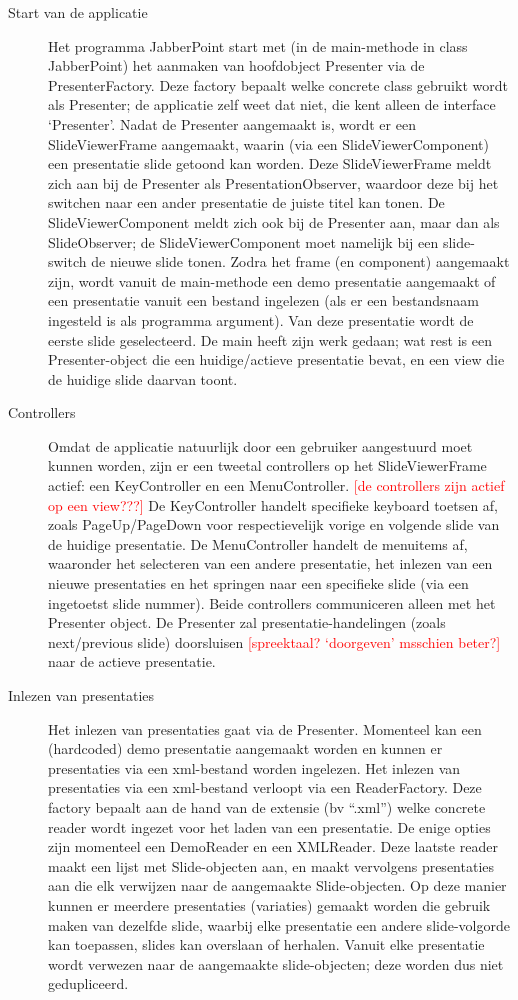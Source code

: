 \documentclass[a4paper]{article}
\newcommand{\todo}[1]{\textcolor{red}{[#1]}}
\begin{document}
\begin{description}
\item[Start van de applicatie] Het programma JabberPoint start met (in de main-methode in class JabberPoint) het aanmaken van hoofdobject Presenter via de PresenterFactory. Deze factory bepaalt welke concrete class gebruikt wordt als Presenter; de applicatie zelf weet dat niet, die kent alleen de interface ‘Presenter’.
Nadat de Presenter aangemaakt is, wordt er een SlideViewerFrame aangemaakt, waarin (via een SlideViewerComponent) een presentatie slide getoond kan worden. Deze SlideViewerFrame meldt zich aan bij de Presenter als PresentationObserver, waardoor deze bij het switchen naar een ander presentatie de juiste titel kan tonen. De SlideViewerComponent meldt zich ook bij de Presenter aan, maar dan als SlideObserver; de SlideViewerComponent moet namelijk bij een slide-switch de nieuwe slide tonen.
Zodra het frame (en component) aangemaakt zijn, wordt vanuit de main-methode een demo presentatie aangemaakt of een presentatie vanuit een bestand ingelezen (als er een bestandsnaam ingesteld is als programma argument). Van deze presentatie wordt de eerste slide geselecteerd.
De main heeft zijn werk gedaan; wat rest is een Presenter-object die een huidige/actieve presentatie bevat, en een view die de huidige slide daarvan toont.
\item[Controllers]
Omdat de applicatie natuurlijk door een gebruiker aangestuurd moet kunnen worden, zijn er een tweetal controllers op het SlideViewerFrame actief: een KeyController en een MenuController. \todo{de controllers zijn actief op een view???}  De KeyController handelt specifieke keyboard toetsen af, zoals PageUp/PageDown voor respectievelijk vorige en volgende slide van de huidige presentatie. De MenuController handelt de menuitems af, waaronder het selecteren van een andere presentatie, het inlezen van een nieuwe presentaties en het springen naar een specifieke slide (via een ingetoetst slide nummer). Beide controllers communiceren alleen met het Presenter object. De Presenter zal presentatie-handelingen (zoals next/previous slide) doorsluisen \todo{spreektaal? `doorgeven' msschien beter?} naar de actieve presentatie.
\item[Inlezen van presentaties]
Het inlezen van presentaties gaat via de Presenter. Momenteel kan een (hardcoded) demo presentatie aangemaakt worden en kunnen er presentaties via een xml-bestand worden ingelezen. Het inlezen van presentaties via een xml-bestand verloopt via een ReaderFactory. Deze factory bepaalt aan de hand van de extensie (bv “.xml”) welke concrete reader wordt ingezet voor het laden van een presentatie. De enige opties zijn momenteel een DemoReader en een XMLReader. Deze laatste reader maakt een lijst met Slide-objecten aan, en maakt vervolgens presentaties aan die elk verwijzen naar de aangemaakte Slide-objecten. Op deze manier kunnen er meerdere presentaties (variaties) gemaakt worden die gebruik maken van dezelfde slide, waarbij elke presentatie een andere slide-volgorde kan toepassen, slides kan overslaan of herhalen. Vanuit elke presentatie wordt verwezen naar de aangemaakte slide-objecten; deze worden dus niet gedupliceerd.

\end{description}
\end{document}
